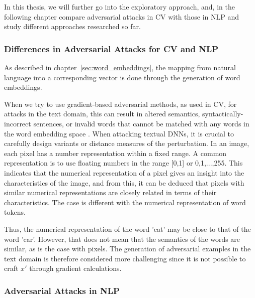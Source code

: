 \cite{huang2011adversarial}

In this thesis, we will further go into the exploratory approach, and, in the following chapter compare adversarial attacks in CV with those in NLP and study different approaches researched so far.

\subsubsection{Differences in Adversarial Attacks for CV and NLP}
    \label{sec:differences_in_adv-ex}

As described in chapter~\ref{sec:word_embeddings}, the mapping from natural language into a corresponding vector is done through the generation of word embeddings.

When we try to use gradient-based adversarial methods, as used in CV, for attacks in the text domain, this can result in altered semantics, syntactically-incorrect sentences, or invalid words that cannot be matched with any words in the word embedding space  \cite{zhang2019adversarial}. When attacking textual DNNs, it is crucial to carefully design variants or distance measures of the perturbation.
In an image, each pixel has a number representation within a fixed range.  A common representation is to use floating numbers in the range [0,1] or {0,1,...,255}. This indicates that the numerical representation of a pixel gives an insight into the characteristics of the image, and from this, it can be deduced that pixels with similar numerical representations are closely related in terms of their characteristics.
The case is different with the numerical representation of word tokens. 



Thus, the numerical representation of the word 'cat' may be close to that of the word 'car'.
However, that does not mean that the semantics of the words are similar, as is the case with pixels. The generation of adversarial examples in the text domain is therefore considered more challenging\cite{carlini2018audio} since it is not possible to craft \(x'\) through gradient calculations. 



\subsubsection{Adversarial Attacks in NLP}
    \label{sec:adv-ex_in_NLP}

